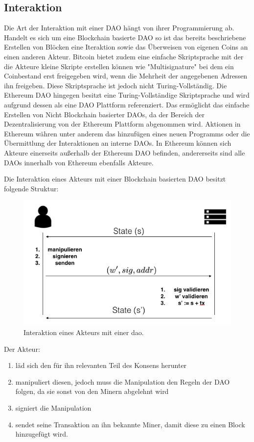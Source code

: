 \documentclass[a4paper,12pt]{report}
\begin{document}
\subsection*{Interaktion}
\label{interaction}
Die Art der Interaktion mit einer DAO hängt von ihrer Programmierung ab. Handelt es sich um eine Blockchain basierte DAO so ist das bereits beschriebene Erstellen von Blöcken eine Iteraktion sowie das Überweisen von eigenen Coins an einen anderen Akteur. Bitcoin bietet zudem eine einfache Skriptsprache mit der die Akteure kleine Skripte erstellen können wie "Multisignature" bei dem ein Coinbestand erst freigegeben wird, wenn die Mehrheit der angegebenen Adressen ihn freigeben. Diese Skriptsprache ist jedoch nicht Turing-Vollständig. Die Ethereum DAO hingegen besitzt eine Turing-Vollständige Skriptsprache und wird aufgrund dessen als eine DAO Plattform referenziert. Das ermöglicht das einfache Erstellen von Nicht Blockchain basierter DAOs, da der Bereich der Dezentralisierung von der Ethereum Plattform abgenommen wird. Aktionen in Ethereum währen unter anderem das hinzufügen eines neuen Programms oder die Übermittlung der Interaktionen an interne DAOs. In Ethereum können sich Akteure einerseits außerhalb der Ethereum DAO befinden, andererseits sind alle DAOs innerhalb von Ethereum ebenfalls Akteure.

Die Interaktion eines Akteurs mit einer Blockchain basierten DAO besitzt folgende Struktur:

\begin{figure}[ht]
    \centering
    \includegraphics[width=1\textwidth]{bilder/interaktion.png}
    \caption{Interaktion eines Akteurs mit einer dao.}
\end{figure}

Der Akteur:
\begin{enumerate}
  \item läd sich den für ihn relevanten Teil des Konsens herunter
  \item manipuliert diesen, jedoch muss die Manipulation den Regeln der DAO folgen, da sie sonst von den Minern abgelehnt wird
  \item signiert die Manipulation
  \item sendet seine Transaktion an ihn bekannte Miner, damit diese zu einen Block hinzugefügt wird.
\end{enumerate}
\end{document}
